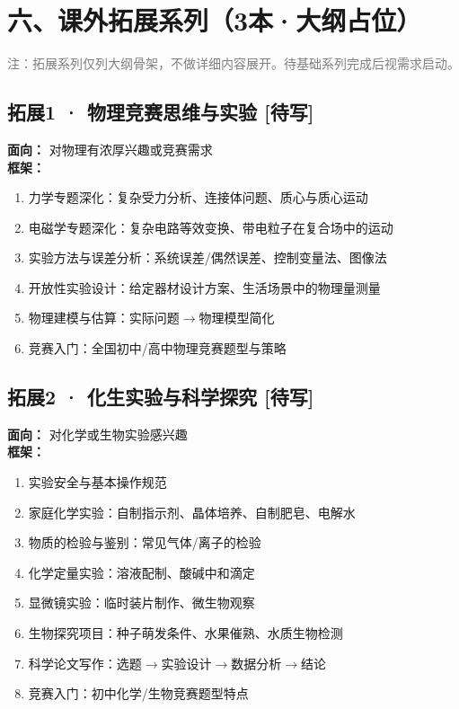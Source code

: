 \documentclass[a4paper,12pt]{ctexart}
\newcommand{\plan}{\textcolor{planblue}{\textbf{[待写]}}}
\begin{document}
\newpage

\section*{\textcolor{orange!80!black}{六、课外拓展系列（3本·大纲占位）}}

\textcolor{gray}{注：拓展系列仅列大纲骨架，不做详细内容展开。待基础系列完成后视需求启动。}

\subsection*{拓展1 · 物理竞赛思维与实验 \plan}

\textbf{面向：} 对物理有浓厚兴趣或竞赛需求\\
\textbf{框架：}
\begin{enumerate}
  \item 力学专题深化：复杂受力分析、连接体问题、质心与质心运动
  \item 电磁学专题深化：复杂电路等效变换、带电粒子在复合场中的运动
  \item 实验方法与误差分析：系统误差/偶然误差、控制变量法、图像法
  \item 开放性实验设计：给定器材设计方案、生活场景中的物理量测量
  \item 物理建模与估算：实际问题$\rightarrow$物理模型简化
  \item 竞赛入门：全国初中/高中物理竞赛题型与策略
\end{enumerate}

\subsection*{拓展2 · 化生实验与科学探究 \plan}

\textbf{面向：} 对化学或生物实验感兴趣\\
\textbf{框架：}
\begin{enumerate}
  \item 实验安全与基本操作规范
  \item 家庭化学实验：自制指示剂、晶体培养、自制肥皂、电解水
  \item 物质的检验与鉴别：常见气体/离子的检验
  \item 化学定量实验：溶液配制、酸碱中和滴定
  \item 显微镜实验：临时装片制作、微生物观察
  \item 生物探究项目：种子萌发条件、水果催熟、水质生物检测
  \item 科学论文写作：选题$\rightarrow$实验设计$\rightarrow$数据分析$\rightarrow$结论
  \item 竞赛入门：初中化学/生物竞赛题型特点
\end{enumerate}
\end{document}
